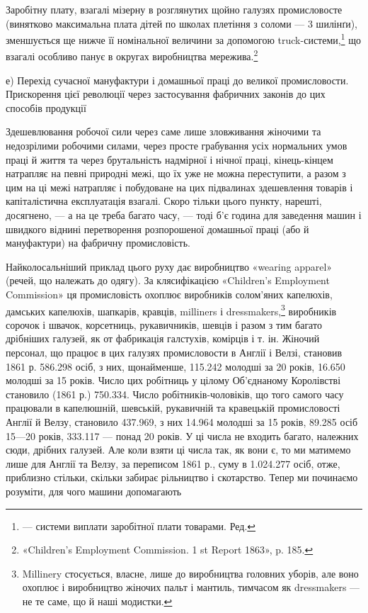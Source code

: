Заробітну плату, взагалі мізерну в розглянутих щойно галузях
промисловосте (винятково максимальна плата дітей по школах
плетіння з соломи — 3 шилінґи), зменшується ще нижче її номінальної
величини за допомогою truck-системи,\footnote*{
— системи виплати заробітної плати товарами. Ред.
} що взагалі
особливо панує в округах виробництва мережива.\footnote{
«Children’s Employment Commission. 1 st Report 1863», p. 185.
}

е) Перехід сучасної мануфактури і домашньої
праці до великої промисловости. Прискорення
цієї революції через застосування фабричних
законів до цих способів продукції

Здешевлювання робочої сили через саме лише зловживання
жіночими та недозрілими робочими силами, через просте грабування
усіх нормальних умов праці й життя та через брутальність
надмірної і нічної праці, кінець-кінцем натрапляє на певні природні
межі, що їх уже не можна переступити, а разом з цим
на ці межі натрапляє і побудоване на цих підвалинах здешевлення
товарів і капіталістична експлуатація взагалі. Скоро тільки цього
пункту, нарешті, досягнено, — а на це треба багато часу, — тоді
б’є година для заведення машин і швидкого віднині перетворення
розпорошеної домашньої праці (або й мануфактури) на фабричну
промисловість.

Найколосальніший приклад цього руху дає виробництво «wearing
apparel» (речей, що належать до одягу). За клясифікацією
«Children’s Employment Commission» ця промисловість охоплює
виробників солом’яних капелюхів, дамських капелюхів, шапкарів,
кравців, milliners і dressmakers,\footnote{
Millinery стосується, власне, лише до виробництва головних уборів,
але воно охоплює і виробництво жіночих пальт і мантиль, тимчасом
як dressmakers — не те саме, що й наші модистки.
} виробників сорочок і швачок,
корсетниць, рукавичників, шевців і разом з тим багато дрібніших
галузей, як от фабрикація галстухів, комірців і т. ін. Жіночий
персонал, що працює в цих галузях промисловости в Англії і
Велзі, становив 1861 р. 586.298 осіб, з них, щонайменше, 115.242
молодші за 20 років, 16.650 молодші за 15 років. Число цих робітниць
у цілому Об’єднаному Королівстві становило (1861 р.)
750.334. Число робітників-чоловіків, що того самого часу працювали
в капелюшній, шевській, рукавичній та кравецькій промисловості
Англії й Велзу, становило 437.969, з них 14.964 молодші
за 15 років, 89.285 осіб 15—20 років, 333.117 — понад 20 років.
У ці числа не входить багато, належних сюди, дрібних галузей.
Але коли взяти ці числа так, як вони є, то ми матимемо лише для
Англії та Велзу, за переписом 1861 р., суму в 1.024.277 осіб,
отже, приблизно стільки, скільки забирає рільництво і скотарство.
Тепер ми починаємо розуміти, для чого машини допомагають
\parbreak{}  %
